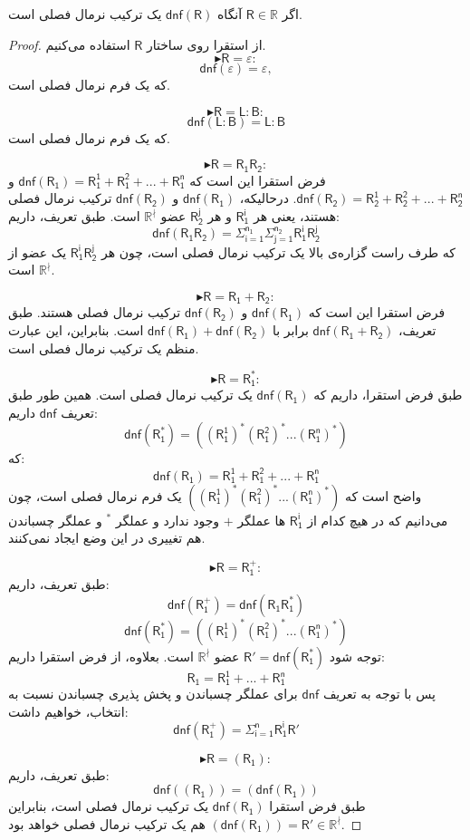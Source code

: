 \begin{thm}
	اگر $\mathsf{R} \in \mathbb{R}$ آنگاه $\mathsf{dnf(R)}$ یک ترکیب نرمال فصلی است.
\end{thm}
\begin{proof}
از استقرا روی ساختار $\mathsf{R}$ استفاده می‌کنیم.
$$\blacktriangleright \mathsf{R}=\varepsilon:$$
$$\mathsf{dnf(\varepsilon)}=\varepsilon,$$
که یک فرم نرمال فصلی است.


$$\blacktriangleright \mathsf{R=L:B}:$$
$$\mathsf{dnf(\mathsf{L:B})}=\mathsf{L:B}$$
که یک فرم نرمال فصلی است.


$$\blacktriangleright \mathsf{R=R_1R_2}:$$
فرض استقرا این است که 
$\mathsf{dnf(R_1)=R_1^1+R_1^2+...+R_1^n}$
و
$\mathsf{dnf(R_2)=R_2^1+R_2^2+...+R_2^n}$.
درحالیکه، $\mathsf{dnf(R_1)}$ و $\mathsf{dnf(R_2)}$ ترکیب نرمال فصلی هستند، یعنی هر $\mathsf{R_1^i}$ و هر $\mathsf{R_2^j}$ عضو $\mathbb{R^{\nmid}}$ است.
طبق تعریف، داریم:
$$\mathsf{dnf}(\mathsf{R_1 R_2})=\mathsf{\Sigma_{i=1}^{n_1}\Sigma_{j=1}^{n_2} R_1^i R_2^j}$$
که طرف راست گزاره‌ی بالا یک ترکیب نرمال فصلی است، چون هر  
$\mathsf{R_1^i R_2^j}$
یک عضو از $\mathbb{R}^\nmid$ است.

$$\blacktriangleright \mathsf{R=R_1+R_2}:$$
فرض استقرا این است که $\mathsf{dnf(R_1)}$ و $\mathsf{dnf(R_2)}$ ترکیب نرمال فصلی هستند. طبق تعریف،
$\mathsf{dnf(R_1+R_2)}$
برابر با
$\mathsf{dnf(R_1)+dnf(R_2)}$
است. بنابراین، این عبارت منظم یک ترکیب نرمال فصلی است.

$$\blacktriangleright \mathsf{R=R_1^*}:$$
طبق فرض استقرا، داریم که $\mathsf{dnf(R_1)}$ یک ترکیب نرمال فصلی است. همین طور طبق تعریف $\mathsf{dnf}$ داریم:
$$\mathsf{dnf(R_1^*)= ((R_1^1)^* (R_1^2)^* ... (R_1^n)^*)}$$
که:
$$\mathsf{dnf(R_1)=R_1^1+R_1^2+...+R_1^n}$$
واضح است که $\mathsf{((R_1^1)^* (R_1^2)^* ... (R_1^n)^*)}$ یک فرم نرمال فصلی است، چون می‌دانیم که در هیچ کدام از $\mathsf{R_1^i}$ ها عملگر $+$ وجود ندارد و عملگر $ ^*$ و عملگر چسباندن هم تغییری در این وضع ایجاد نمی‌کنند.

$$\blacktriangleright \mathsf{R=R_1^+}:$$
طبق تعریف، داریم:
$$\mathsf{dnf(R_1^+)=dnf(R_1 R_1^*)}$$
$$\mathsf{dnf(R_1^*)= ((R_1^1)^* (R_1^2)^* ... (R_1^n)^*)}$$
توجه شود 
$\mathsf{R'=dnf(R_1^*)}$
 عضو 
 $\mathbb{R^\nmid}$
است. بعلاوه، از فرض استقرا داریم:
$$\mathsf{R_1= R_1^1 + ... + R_1^n}$$
پس با توجه به تعریف $\mathsf{dnf}$ برای عملگر چسباندن و پخش پذیری چسباندن نسبت به انتخاب، خواهیم داشت:
$$\mathsf{dnf(R_1^+) = \Sigma_{i=1}^n R_1^i R'}$$

$$\blacktriangleright \mathsf{R=(R_1)}:$$
طبق تعریف، داریم:
$$\mathsf{dnf((R_1))=(dnf(R_1))}$$
طبق فرض استقرا 
$\mathsf{dnf(R_1)}$
یک ترکیب نرمال فصلی است، بنابراین 
$\mathsf{(dnf(R_1))=R'} \in \mathbb{R^\nmid}$ 
هم یک ترکیب نرمال فصلی خواهد بود.

\end{proof}


